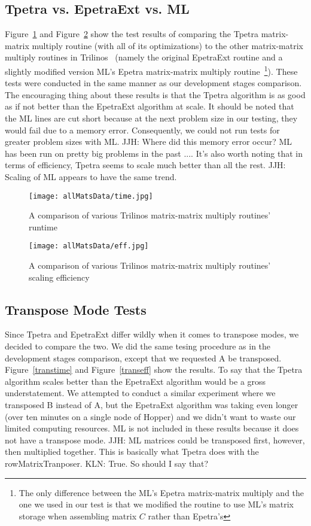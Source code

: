 \documentclass[pdf,12pt, strict]{SANDreport}
\newcommand{\JJH}[1]{\textcolor{jhuGreen}{JJH: #1}}
\newcommand{\KLN}[1]{\textcolor{klnBlue}{KLN: #1}}
\begin{document}
\subsection{Tpetra vs. EpetraExt vs. ML}
Figure~\ref{alltime} and Figure~\ref{alleff} show the test results of comparing the Tpetra matrix-matrix multiply routine 
(with all of its optimizations) to the other matrix-matrix multiply routines in Trilinos~\cite{1089021} (namely the original EpetraExt 
routine and a slightly modified version ML's Epetra matrix-matrix multiply routine~\footnote{The only difference between the ML's Epetra matrix-matrix
multiply and the one we used in our test is that we modified the routine to use ML's matrix storage when assembling matrix $C$ rather than Epetra's}). 
These tests were conducted in the same manner as our development stages comparison. 
The encouraging thing about these results is that the Tpetra algorithm is as good as if not better than the EpetraExt 
algorithm at scale. It should be noted that the ML lines are cut short because at the next problem size in our testing, 
they would fail due to a memory error. Consequently, we could not run tests for greater problem sizes with ML. 
\JJH{Where did this memory error occur?  ML has been run on pretty big problems in the past ....}
It's also worth noting that in terms of efficiency, Tpetra seems to scale much better than all the rest.
\JJH{Scaling of ML appears to have the same trend.}

\begin{figure}
\centering
\texttt{[image: allMatsData/time.jpg]}
\caption[All Algorithms Time Comparison]{A comparison of various Trilinos matrix-matrix multiply routines' runtime}
\label{alltime}
\end{figure}

\begin{figure}
\centering
\texttt{[image: allMatsData/eff.jpg]}
\caption[All Algorithms Efficiency Comparison]{A comparison of various Trilinos matrix-matrix multiply routines' scaling efficiency}
\label{alleff}
\end{figure}

\subsection{Transpose Mode Tests}
Since Tpetra and EpetraExt differ wildly when it comes to transpose modes, we decided to compare the two. We did the same
tesing procedure as in the development stages comparison, except that we requested A be transposed. Figure~\ref{transtime}
and Figure~\ref{transeff} show the results. To say that the Tpetra algorithm scales better than the EpetraExt algorithm
would be a gross understatement. We attempted to conduct a similar experiment where we transposed B instead of A, 
but the EpetraExt algorithm was taking even longer (over ten minutes on a single node of Hopper) and we didn't want to 
waste our limited computing resources. ML is not included in these results because it does not have a transpose mode.
\JJH{ML matrices could be transposed first, however, then multiplied together.  This is basically what Tpetra does with
the rowMatrixTranposer.}
\KLN{True. So should I say that?}
\end{document}

